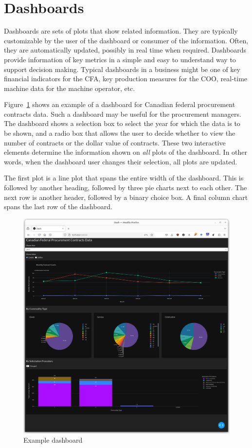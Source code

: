 \section{Dashboards}

Dashboards are sets of plots that show related information. They are typically customizable by the user of the dashboard or consumer of the information. Often, they are automatically updated, possibly in real time when required. Dashboards provide information of key metrics in a simple and easy to understand way to support decision making. Typical dashboards in a business might be one of key financial indicators for the CFA, key production measures for the COO, real-time machine data for the machine operator, etc. 

Figure~\ref{fig:dashboard} shows an example of a dashboard for Canadian federal procurement contracts data. Such a dashboard may be useful for the procurement managers. The dashboard shows a selection box to select the year for which the data is to be shown, and a radio box that allows the user to decide whether to view the number of contracts or the dollar value of contracts. These two interactive elements determine the information shown on \emph{all} plots of the dashboard. In other words, when the dashboard user changes their selection, all plots are updated. 

The first plot is a line plot that spans the entire width of the dashboard. This is followed by another heading, followed by three pie charts next to each other. The next row is another header, followed by a binary choice box. A final column chart spans the last row of the dashboard.

\begin{figure}
\centering

  \includegraphics[width=\textwidth]{dashboard.png}
  \caption{Example dashboard}
  \label{fig:dashboard}
\end{figure}

